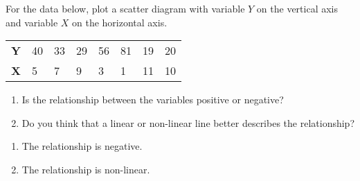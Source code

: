 \begin{enumialphparenastyle}
\begin{ex}
\begin{sol}
\end{sol}
\end{ex}

\begin{ex}\label{ex:ch2ex10}
For the data below, plot a scatter diagram with variable $Y$ on the vertical axis and variable $X$ on the horizontal axis.
\begin{center}
\begin{tabu} to 27em {|X[1,c]X[1,c]X[1,c]X[1,c]X[1,c]X[1,c]X[1,c]X[1,c]|}	\hline
{}	\textbf{Y}	&	40	&	33	&	29	&	56	&	81	&	19	&	20	\\
						\textbf{X}	&	5	&	7	&	9	&	3	&	1	&	11	&	10	\\	\hline
\end{tabu}
\end{center}
\begin{enumerate}
	\item	Is the relationship between the variables positive or negative?
	\item	Do you think that a linear or non-linear line better describes the relationship?
\end{enumerate}
\begin{sol}
\begin{enumerate}
	\item	The relationship is negative.
	\item	The relationship is non-linear.
\end{enumerate}
\end{sol}
\end{ex}


\end{enumialphparenastyle}